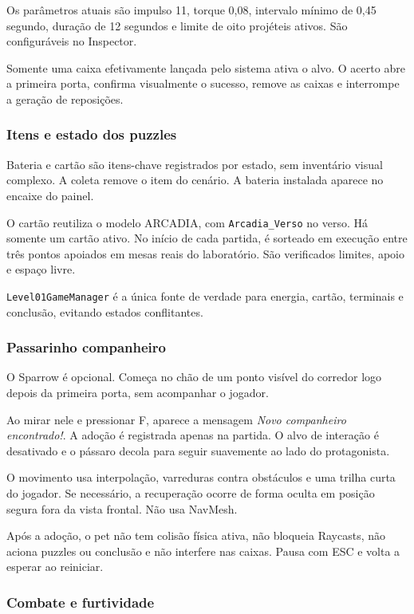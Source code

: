 \documentclass[12pt,a4paper]{article}
\begin{document}
Os parâmetros atuais são impulso 11, torque 0,08, intervalo mínimo
de 0,45 segundo, duração de 12 segundos e limite de oito projéteis
ativos. São configuráveis no Inspector.

Somente uma caixa efetivamente lançada pelo sistema ativa o alvo.
O acerto abre a primeira porta, confirma visualmente o sucesso,
remove as caixas e interrompe a geração de reposições.

\subsubsection{Itens e estado dos puzzles}

Bateria e cartão são itens-chave registrados por estado, sem
inventário visual complexo. A coleta remove o item do cenário.
A bateria instalada aparece no encaixe do painel.

O cartão reutiliza o modelo ARCADIA, com \texttt{Arcadia\_Verso}
no verso. Há somente um cartão ativo. No início de cada partida,
é sorteado em execução entre três pontos apoiados em mesas reais
do laboratório. São verificados limites, apoio e espaço livre.

\texttt{Level01GameManager} é a única fonte de verdade para energia,
cartão, terminais e conclusão, evitando estados conflitantes.

\subsubsection{Passarinho companheiro}

O Sparrow é opcional. Começa no chão de um ponto visível do corredor
logo depois da primeira porta, sem acompanhar o jogador.

Ao mirar nele e pressionar F, aparece a mensagem
\emph{Novo companheiro encontrado!}. A adoção é registrada apenas na
partida. O alvo de interação é desativado e o pássaro decola para
seguir suavemente ao lado do protagonista.

O movimento usa interpolação, varreduras contra obstáculos e uma
trilha curta do jogador. Se necessário, a recuperação ocorre de
forma oculta em posição segura fora da vista frontal. Não usa NavMesh.

Após a adoção, o pet não tem colisão física ativa, não bloqueia
Raycasts, não aciona puzzles ou conclusão e não interfere nas caixas.
Pausa com ESC e volta a esperar ao reiniciar.

\subsubsection{Combate e furtividade}
\end{document}
